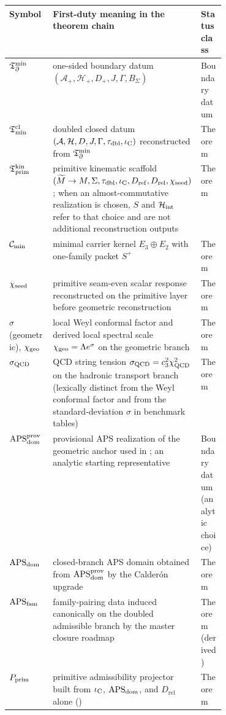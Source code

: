 \begin{table}[p]
\centering
\scriptsize
\setlength{\tabcolsep}{3pt}
\renewcommand{\arraystretch}{0.95}
\begin{tabularx}{\linewidth}{@{}>{\raggedright\arraybackslash}p{0.23\linewidth}Y>{\raggedright\arraybackslash}p{0.18\linewidth}@{}}
\toprule
Symbol & First-duty meaning in the theorem chain & Status class \\
\midrule
$\mathfrak T_{\partial}^{\min}$ & one-sided boundary datum $(\mathcal A_+,\mathcal H_+,D_+,J,\Gamma,B_\Sigma)$ & Boundary datum \\
$\mathfrak T_{\mathrm{min}}^{\mathrm{cl}}$ & doubled closed datum $(\mathcal A,\mathcal H,D,J,\Gamma,\tau_{\mathrm{dbl}},\iota_{\mathrm C})$ reconstructed from $\mathfrak T_{\partial}^{\min}$ & Theorem \\
$\mathfrak T_{\mathrm{prim}}^{\mathrm{kin}}$ & primitive kinematic scaffold $(\widetilde M\to M,\Sigma,\tau_{\mathrm{dbl}},\iota_{\mathrm C},D_{\mathrm{ref}},D_{\mathrm{rel}},\chi_{\mathrm{seed}})$; when an almost-commutative realization is chosen, $S$ and $\mathcal H_{\mathrm{int}}$ refer to that choice and are not additional reconstruction outputs & Theorem \\
$\mathcal C_{\min}$ & minimal carrier kernel $E_3\oplus E_2$ with one-family packet $S^+$ & Theorem \\
$\chi_{\mathrm{seed}}$ & primitive seam-even scalar response reconstructed on the primitive layer before geometric reconstruction & Theorem \\
$\sigma$ (geometric), $\chi_{\mathrm{geo}}$ & local Weyl conformal factor and derived local spectral scale $\chi_{\mathrm{geo}}=\Lambda e^\sigma$ on the geometric branch & Theorem \\
$\sigma_{\mathrm{QCD}}$ & QCD string tension $\sigma_{\mathrm{QCD}}=c_3^2\chi_{\mathrm{QCD}}^2$ on the hadronic transport branch (lexically distinct from the Weyl conformal factor and from the standard-deviation $\sigma$ in benchmark tables) & Theorem \\
$\mathrm{APS}_{\mathrm{dom}}^{\mathrm{prov}}$ & provisional APS realization of the geometric anchor used in ; an analytic starting representative & Boundary datum (analytic choice) \\
$\mathrm{APS}_{\mathrm{dom}}$ & closed-branch APS domain obtained from $\mathrm{APS}_{\mathrm{dom}}^{\mathrm{prov}}$ by the Calder\'on upgrade  & Theorem \\
$\mathrm{APS}_{\mathrm{fam}}$ & family-pairing data induced canonically on the doubled admissible branch by the master closure roadmap & Theorem (derived) \\
$P_{\mathrm{prim}}$ & primitive admissibility projector built from $\iota_{\mathrm C}$, $\mathrm{APS}_{\mathrm{dom}}$, and $D_{\mathrm{rel}}$ alone () & Theorem \\

\end{tabularx}
\end{table}
